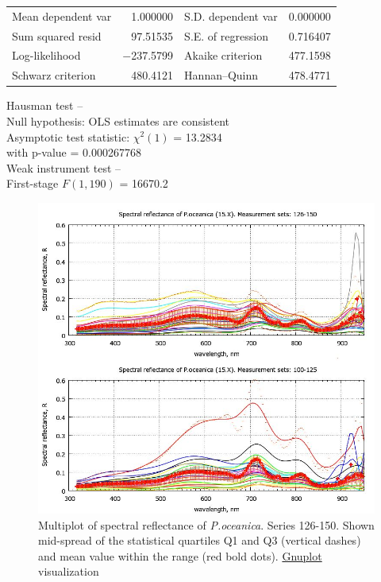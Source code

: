 \documentclass[11pt]{article}
\begin{document}
\begin{appendices}
\begin{table}[htbp]
\begin{center}
	\vspace{1ex}
	\begin{tabular}{lrlr}
		Mean dependent var &  1.000000 & S.D. dependent var &  0.000000 \\
		Sum squared resid &  97.51535 & S.E. of regression &  0.716407 \\
		Log-likelihood & $-$237.5799 & Akaike criterion &  477.1598 \\
		Schwarz criterion &  480.4121 & Hannan--Quinn &  478.4771 \\
	\end{tabular}

	\vspace{1em}
	\begin{raggedright}
		Hausman test --\\
		\quad Null hypothesis: OLS estimates are consistent\\
		\quad Asymptotic test statistic: $\chi^2(1)$ = 13.2834\\
		\quad with p-value = 0.000267768\\
	\vspace{1ex}
		Weak instrument test -- \\
		\quad First-stage $F(1, 190)$ = 16670.2 \\
	\end{raggedright}

	\end{center}
	\label{tab:18}
\end{table}

\begin{figure}[H]
	\begin{center}
		\includegraphics[scale=0.4]{GNU-14.jpg}
		\caption{Multiplot of spectral reflectance of \textit{P.oceanica}. Series 126-150. Shown mid-spread of the statistical quartiles Q1 and Q3 (vertical dashes) and mean value within the range (red bold dots). \href{http://www.gnuplot.info/}{Gnuplot} visualization­}
		\label{fig:A.27}
	\end{center}
\end{figure}


\end{appendices}
\end{document}
